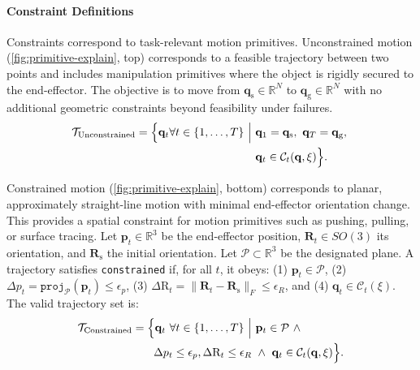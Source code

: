 \paragraph{Constraint Definitions}
Constraints correspond to task-relevant motion primitives. Unconstrained motion (\cref{fig:primitive-explain}, top) corresponds to a feasible trajectory between two points and includes manipulation primitives where the object is rigidly secured to the end-effector. The objective is to move from $\mathbf{q}_\text{s}\in\mathbb{R}^N$ to $\mathbf{q}_\text{g}\in\mathbb{R}^N$ with no additional geometric constraints beyond feasibility under failures.%
{\setlength{\abovedisplayskip}{6pt}\setlength{\belowdisplayskip}{6pt}\setlength{\abovedisplayshortskip}{4pt}\setlength{\belowdisplayshortskip}{4pt}%
\begin{equation}\small
\begin{aligned}
  \mathcal{T}_\text{Unconstrained}=\Big\{\mathbf{q}_t \forall t\in\{1,\dots,T\}\ \Big|\ 
  & \mathbf{q}_1=\mathbf{q}_\text{s},\  \mathbf{q}_T=\mathbf{q}_\text{g},\ \\
  & \mathbf{q}_t\in \mathcal{C}_t(\mathbf{q},\xi)\Big\}.
\end{aligned}
\end{equation}}%

Constrained motion (\cref{fig:primitive-explain}, bottom) corresponds to planar, approximately straight-line motion with minimal end-effector orientation change. This provides a spatial constraint for motion primitives such as pushing, pulling, or surface tracing. Let $\mathbf{p}_t\in\mathbb{R}^3$ be the end-effector position, $\mathbf{R}_t\in SO(3)$ its orientation, and $\mathbf{R}_\text{s}$ the initial orientation. Let $\mathcal{P}\subset\mathbb{R}^3$ be the designated plane. A trajectory satisfies \texttt{constrained} if, for all $t$, it obeys: (1) $\mathbf{p}_t\in\mathcal{P}$, (2) $\Delta p_t=\texttt{proj}_{\mathcal{P}}(\mathbf{p}_t)\le \epsilon_p$, (3) $\Delta \mathrm{R}_t=\|\mathbf{R}_t-\mathbf{R}_\text{s}\|_F\le \epsilon_R$, and (4) $\mathbf{q}_t\in \mathcal{C}_t(\xi)$. The valid trajectory set is:%
{\setlength{\abovedisplayskip}{6pt}\setlength{\belowdisplayskip}{6pt}\setlength{\abovedisplayshortskip}{4pt}\setlength{\belowdisplayshortskip}{4pt}%
\begin{equation}\small
\begin{aligned}
  \mathcal{T}_\text{Constrained}
  = \Big\{\mathbf{q}_{t}\ \forall t\in\{1,\dots,T\}\ \Big|\ &
  \mathbf{p}_t\in\mathcal{P}\ \land\ \\ \Delta p_t\le \epsilon_p,
   \Delta \mathrm{R}_t\le \epsilon_R\ & \land\ \mathbf{q}_t\in \mathcal{C}_t(\mathbf{q},\xi)
  \Big\}.
\end{aligned}
\end{equation}}%

